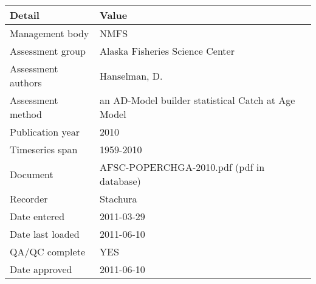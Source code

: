 \begin{table}[htb]
\centering
\begin{tabular}{lp{7cm}}
\toprule
Detail & Value \\
\midrule
Management body    & NMFS                                               \\
Assessment group   & Alaska Fisheries Science Center                    \\
Assessment authors & Hanselman, D.                                      \\
Assessment method  & an AD-Model builder statistical Catch at Age Model \\
Publication year   & 2010                                               \\
Timeseries span    & 1959-2010                                          \\
Document           & AFSC-POPERCHGA-2010.pdf (pdf in database)          \\
Recorder           & Stachura                                           \\
Date entered       & 2011-03-29                                         \\
Date last loaded   & 2011-06-10                                         \\
QA/QC complete     & YES                                                \\
Date approved      & 2011-06-10                                         \\
\bottomrule
\end{tabular}
\label{tab:assessdet}
\end{table}
